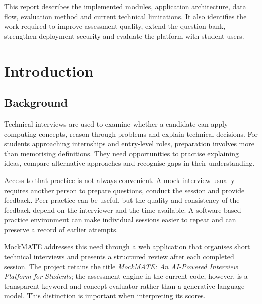 \documentclass[12pt,a4paper,oneside]{report}
\begin{document}
This report describes the implemented modules, application architecture, data flow, evaluation method and current technical limitations. It also identifies the work required to improve assessment quality, extend the question bank, strengthen deployment security and evaluate the platform with student users.
\clearpage

\tableofcontents
\clearpage
{}
\listoffigures
\clearpage
{}
\listoftables
\clearpage

\setcounter{page}{1}

\chapter{Introduction}

\section{Background}
Technical interviews are used to examine whether a candidate can apply computing concepts, reason through problems and explain technical decisions. For students approaching internships and entry-level roles, preparation involves more than memorising definitions. They need opportunities to practise explaining ideas, compare alternative approaches and recognise gaps in their understanding.

Access to that practice is not always convenient. A mock interview usually requires another person to prepare questions, conduct the session and provide feedback. Peer practice can be useful, but the quality and consistency of the feedback depend on the interviewer and the time available. A software-based practice environment can make individual sessions easier to repeat and can preserve a record of earlier attempts.

MockMATE addresses this need through a web application that organises short technical interviews and presents a structured review after each completed session. The project retains the title \emph{MockMATE: An AI-Powered Interview Platform for Students}; the assessment engine in the current code, however, is a transparent keyword-and-concept evaluator rather than a generative language model. This distinction is important when interpreting its scores.
\end{document}
